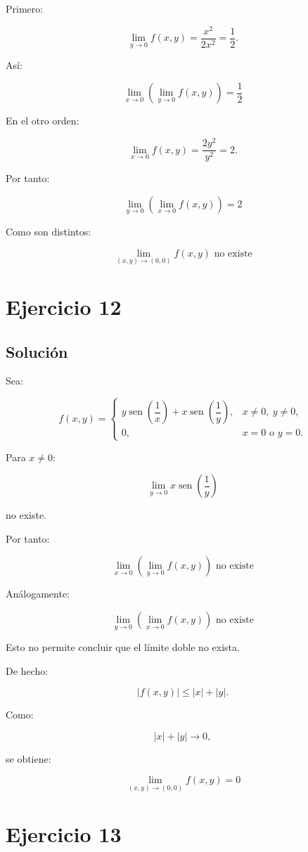 \documentclass[11pt,a4paper]{article}
\newcommand{\sen}{\operatorname{sen}}
\begin{document}
Primero:

\[
\lim_{y\to0}f(x,y)
=
\frac{x^2}{2x^2}
=
\frac12.
\]

Así:

\[
\boxed{
\lim_{x\to0}
\left(
\lim_{y\to0}f(x,y)
\right)
=
\frac12
}
\]

En el otro orden:

\[
\lim_{x\to0}f(x,y)
=
\frac{2y^2}{y^2}
=
2.
\]

Por tanto:

\[
\boxed{
\lim_{y\to0}
\left(
\lim_{x\to0}f(x,y)
\right)
=
2
}
\]

Como son distintos:

\[
\boxed{
\lim_{(x,y)\to(0,0)}f(x,y)
\text{ no existe}
}
\]

\section{Ejercicio 12}
\subsection{Solución}

Sea:

\[
f(x,y)
=
\begin{cases}
y\sen\left(\dfrac1x\right)
+
x\sen\left(\dfrac1y\right),
&
x\neq0,\ y\neq0,\\[2mm]
0,
&
x=0\text{ o }y=0.
\end{cases}
\]

Para \(x\neq0\):

\[
\lim_{y\to0}
x\sen\left(\frac1y\right)
\]

no existe.

Por tanto:

\[
\boxed{
\lim_{x\to0}
\left(
\lim_{y\to0}f(x,y)
\right)
\text{ no existe}
}
\]

Análogamente:

\[
\boxed{
\lim_{y\to0}
\left(
\lim_{x\to0}f(x,y)
\right)
\text{ no existe}
}
\]

Esto no permite concluir que el límite doble no exista.

De hecho:

\[
|f(x,y)|
\leq
|x|+|y|.
\]

Como:

\[
|x|+|y|
\to0,
\]

se obtiene:

\[
\boxed{
\lim_{(x,y)\to(0,0)}f(x,y)=0
}
\]

\section{Ejercicio 13}
\end{document}
